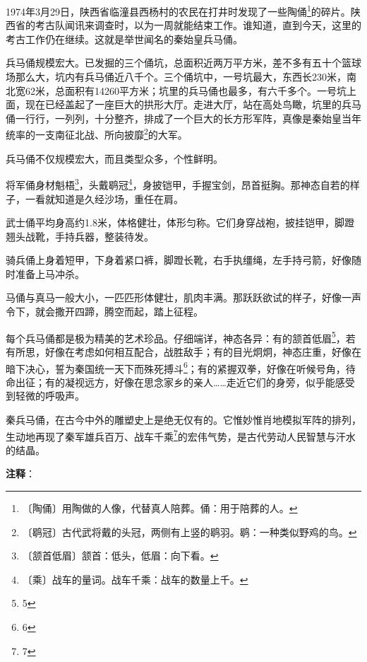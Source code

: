 \documentclass[12pt,UTF-8,openany]{ctexbook}
\begin{document}
\begin{large}
    
    1974年3月29日，陕西省临潼县西杨村的农民在打井时发现了一些陶俑\footnote{〔陶俑〕用陶做的人像，代替真人陪葬。俑：用于陪葬的人。}的碎片。陕西省的考古队闻讯来调查时，以为一周就能结束工作。谁知道，直到今天，这里的考古工作仍在继续。这就是举世闻名的秦始皇兵马俑。
    
    兵马俑规模宏大。已发掘的三个俑坑，总面积近两万平方米，差不多有五十个篮球场那么大，坑内有兵马俑近八千个。三个俑坑中，一号坑最大，东西长230米，南北宽62米，总面积有14260平方米；坑里的兵马俑也最多，有六千多个。一号坑上面，现在已经盖起了一座巨大的拱形大厅。走进大厅，站在高处鸟瞰，坑里的兵马俑一行行，一列列，十分整齐，排成了一个巨大的长方形军阵，真像是秦始皇当年统率的一支南征北战、所向披靡\footnote{〔鹖冠〕古代武将戴的头冠，两侧有上竖的鹖羽。鹖：一种类似野鸡的鸟。}的大军。
    
    兵马俑不仅规模宏大，而且类型众多，个性鲜明。
    
    将军俑身材魁梧\footnote{〔颔首低眉〕颔首：低头，低眉：向下看。}，头戴鹖冠\footnote{〔乘〕战车的量词。战车千乘：战车的数量上千。}，身披铠甲，手握宝剑，昂首挺胸。那神态自若的样子，一看就知道是久经沙场，重任在肩。
    
    武士俑平均身高约1.8米，体格健壮，体形匀称。它们身穿战袍，披挂铠甲，脚蹬翘头战靴，手持兵器，整装待发。
    
    骑兵俑上身着短甲，下身着紧口裤，脚蹬长靴，右手执缰绳，左手持弓箭，好像随时准备上马冲杀。
    
    马俑与真马一般大小，一匹匹形体健壮，肌肉丰满。那跃跃欲试的样子，好像一声令下，就会撒开四蹄，腾空而起，踏上征程。
    
    每个兵马俑都是极为精美的艺术珍品。仔细端详，神态各异：有的颔首低眉\footnote{5}，若有所思，好像在考虑如何相互配合，战胜敌手；有的目光炯炯，神态庄重，好像在暗下决心，誓为秦国统一天下而殊死搏斗\footnote{6}；有的紧握双拳，好像在听候号角，待命出征；有的凝视远方，好像在思念家乡的亲人……走近它们的身旁，似乎能感受到轻微的呼吸声。
    
    秦兵马俑，在古今中外的雕塑史上是绝无仅有的。它惟妙惟肖地模拟军阵的排列，生动地再现了秦军雄兵百万、战车千乘\footnote{7}的宏伟气势，是古代劳动人民智慧与汗水的结晶。
    
\end{large}


\newpage

\textbf{注释}：

\vspace{-1em}
\end{document}
